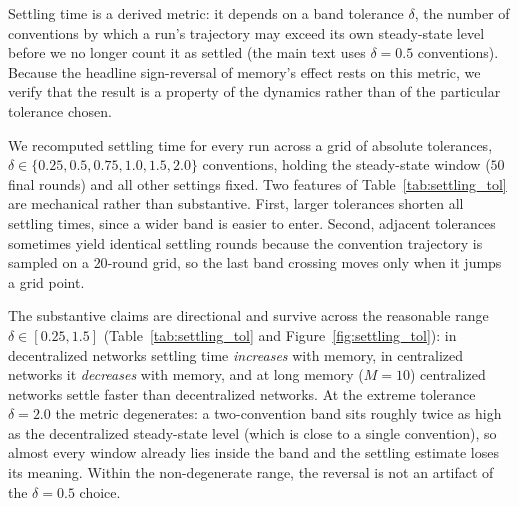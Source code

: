 \documentclass{article}
\begin{document}
\begin{appendices}
Settling time is a derived metric: it depends on a band tolerance $\delta$, the number of conventions by which a run's trajectory may exceed its own steady-state level before we no longer count it as settled (the main text uses $\delta = 0.5$ conventions). Because the headline sign-reversal of memory's effect rests on this metric, we verify that the result is a property of the dynamics rather than of the particular tolerance chosen.

We recomputed settling time for every run across a grid of absolute tolerances, $\delta \in \{0.25, 0.5, 0.75, 1.0, 1.5, 2.0\}$ conventions, holding the steady-state window ($50$ final rounds) and all other settings fixed. Two features of Table~\ref{tab:settling_tol} are mechanical rather than substantive.
First, larger tolerances shorten all settling times, since a wider band is easier to enter. Second, adjacent tolerances sometimes yield identical settling rounds because the convention trajectory is sampled on a $20$-round grid, so the last band crossing moves only when it jumps a grid point.

The substantive claims are directional and survive across the reasonable range $\delta \in [0.25, 1.5]$ (Table~\ref{tab:settling_tol} and Figure~\ref{fig:settling_tol}): in decentralized networks settling time \emph{increases} with memory, in centralized networks it \emph{decreases} with
memory, and at long memory ($M=10$) centralized networks settle faster than decentralized networks. At the extreme tolerance $\delta = 2.0$ the metric degenerates: a two-convention band sits roughly twice as high as the decentralized steady-state level (which is close to a single convention), so almost every window already lies inside the band and the settling estimate loses its meaning. Within the non-degenerate range, the reversal is not an artifact of
the $\delta = 0.5$ choice.


\end{appendices}
\end{document}
